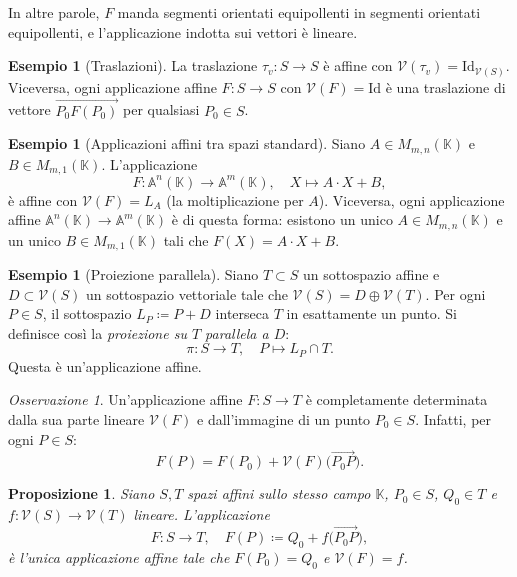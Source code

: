 \documentclass[11pt, a4paper]{book}
\theoremstyle{definition}
\newtheorem{esempio}[definizione]{Esempio}
\theoremstyle{plain}
\newtheorem{proposizione}[definizione]{Proposizione}
\theoremstyle{remark}
\newtheorem{osservazione}[definizione]{Osservazione}
\newcommand{\K}{\mathbb{K}}
\newcommand{\Id}{\mathrm{Id}}
\newcommand{\VV}{\mathcal{V}}   %
\begin{document}
In altre parole, $F$ manda segmenti orientati equipollenti in segmenti orientati equipollenti, e l'applicazione indotta sui vettori è lineare.

\begin{exbox}
\begin{esempio}[Traslazioni]
La traslazione $\tau_v \colon S \to S$ è affine con $\VV(\tau_v) = \Id_{\VV(S)}$. Viceversa, ogni applicazione affine $F \colon S \to S$ con $\VV(F) = \Id$ è una traslazione di vettore $\overrightarrow{P_0F(P_0)}$ per qualsiasi $P_0 \in S$.
\end{esempio}
\end{exbox}

\begin{exbox}
\begin{esempio}[Applicazioni affini tra spazi standard]
\label{es:appl-affine-matriciale}
Siano $A \in M_{m,n}(\K)$ e $B \in M_{m,1}(\K)$. L'applicazione
\[
  F \colon \mathbb{A}^n(\K) \to \mathbb{A}^m(\K), \quad X \mapsto A \cdot X + B,
\]
è affine con $\VV(F) = L_A$ (la moltiplicazione per $A$). Viceversa, ogni applicazione affine $\mathbb{A}^n(\K) \to \mathbb{A}^m(\K)$ è di questa forma: esistono un unico $A \in M_{m,n}(\K)$ e un unico $B \in M_{m,1}(\K)$ tali che $F(X) = A \cdot X + B$.
\end{esempio}
\end{exbox}

\begin{exbox}
\begin{esempio}[Proiezione parallela]
Siano $T \subset S$ un sottospazio affine e $D \subset \VV(S)$ un sottospazio vettoriale tale che $\VV(S) = D \oplus \VV(T)$. Per ogni $P \in S$, il sottospazio $L_P \coloneqq P + D$ interseca $T$ in esattamente un punto. Si definisce così la \emph{proiezione su $T$ parallela a $D$}:
\[
  \pi \colon S \to T, \quad P \mapsto L_P \cap T.
\]
Questa è un'applicazione affine.
\end{esempio}
\end{exbox}

\begin{osservazione}
\label{oss:F-determinata}
Un'applicazione affine $F \colon S \to T$ è completamente determinata dalla sua parte lineare $\VV(F)$ e dall'immagine di un punto $P_0 \in S$. Infatti, per ogni $P \in S$:
\[
  F(P) = F(P_0) + \VV(F)\bigl(\overrightarrow{P_0P}\bigr).
\]
\end{osservazione}

\begin{proposizione}
\label{prop:costruzione-affine}
Siano $S, T$ spazi affini sullo stesso campo $\K$, $P_0 \in S$, $Q_0 \in T$ e $f \colon \VV(S) \to \VV(T)$ lineare. L'applicazione
\[
  F \colon S \to T, \quad F(P) \coloneqq Q_0 + f\bigl(\overrightarrow{P_0P}\bigr),
\]
è l'unica applicazione affine tale che $F(P_0) = Q_0$ e $\VV(F) = f$.
\end{proposizione}
\end{document}
